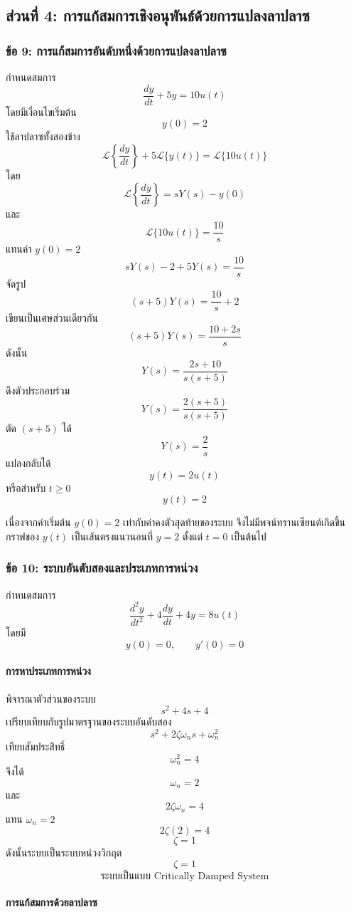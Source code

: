 \subsection{ส่วนที่ 4: การแก้สมการเชิงอนุพันธ์ด้วยการแปลงลาปลาซ}

\subsubsection{ข้อ 9: การแก้สมการอันดับหนึ่งด้วยการแปลงลาปลาซ}

กำหนดสมการ
\[
\frac{dy}{dt}+5y=10u(t)
\]
โดยมีเงื่อนไขเริ่มต้น
\[
y(0)=2
\]
ใช้ลาปลาซทั้งสองข้าง
\[
\mathcal{L}\left\{\frac{dy}{dt}\right\}+5\mathcal{L}\{y(t)\}=\mathcal{L}\{10u(t)\}
\]
โดย
\[
\mathcal{L}\left\{\frac{dy}{dt}\right\}=sY(s)-y(0)
\]
และ
\[
\mathcal{L}\{10u(t)\}=\frac{10}{s}
\]
แทนค่า $y(0)=2$
\[
sY(s)-2+5Y(s)=\frac{10}{s}
\]
จัดรูป
\[
(s+5)Y(s)=\frac{10}{s}+2
\]
เขียนเป็นเศษส่วนเดียวกัน
\[
(s+5)Y(s)=\frac{10+2s}{s}
\]
ดังนั้น
\[
Y(s)=\frac{2s+10}{s(s+5)}
\]
ดึงตัวประกอบร่วม
\[
Y(s)=\frac{2(s+5)}{s(s+5)}
\]
ตัด $(s+5)$ ได้
\[
Y(s)=\frac{2}{s}
\]
แปลงกลับได้
\[
\boxed{y(t)=2u(t)}
\]
หรือสำหรับ $t\ge 0$
\[
\boxed{y(t)=2}
\]

เนื่องจากค่าเริ่มต้น $y(0)=2$ เท่ากับค่าคงตัวสุดท้ายของระบบ จึงไม่มีพจน์ทรานเซียนต์เกิดขึ้น กราฟของ $y(t)$ เป็นเส้นตรงแนวนอนที่ $y=2$ ตั้งแต่ $t=0$ เป็นต้นไป

\subsubsection{ข้อ 10: ระบบอันดับสองและประเภทการหน่วง}

กำหนดสมการ
\[
\frac{d^2y}{dt^2}+4\frac{dy}{dt}+4y=8u(t)
\]
โดยมี
\[
y(0)=0,\qquad y'(0)=0
\]

\paragraph{การหาประเภทการหน่วง}

พิจารณาตัวส่วนของระบบ
\[
s^2+4s+4
\]
เปรียบเทียบกับรูปมาตรฐานของระบบอันดับสอง
\[
s^2+2\zeta\omega_n s+\omega_n^2
\]
เทียบสัมประสิทธิ์
\[
\omega_n^2=4
\]
จึงได้
\[
\omega_n=2
\]
และ
\[
2\zeta\omega_n=4
\]
แทน $\omega_n=2$
\[
2\zeta(2)=4
\]
\[
\zeta=1
\]
ดังนั้นระบบเป็นระบบหน่วงวิกฤต
\[
\boxed{\zeta=1}
\]
\[
\boxed{\text{ระบบเป็นแบบ Critically Damped System}}
\]

\paragraph{การแก้สมการด้วยลาปลาซ}

